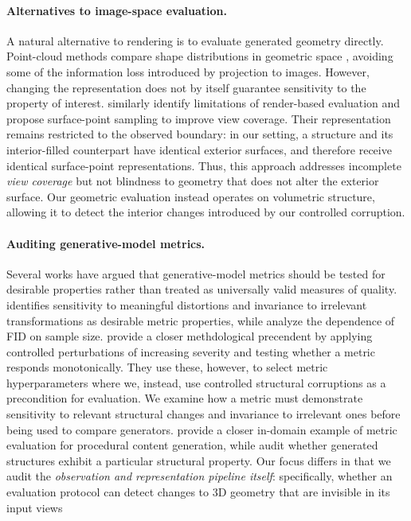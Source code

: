 
\paragraph{Alternatives to image-space evaluation.}
A natural alternative to rendering is to evaluate generated geometry directly. Point-cloud methods compare shape distributions in geometric space \citep{achlioptas2018pointclouds}, avoiding some of the information loss introduced by projection to images. However, changing the representation does not by itself guarantee sensitivity to the property of interest. \citet{luan2026rendermetric} similarly identify limitations of render-based evaluation and propose surface-point sampling to improve view coverage. Their representation remains restricted to the observed boundary: in our setting, a structure and its interior-filled counterpart have identical exterior surfaces, and therefore receive identical surface-point representations. Thus, this approach addresses incomplete \emph{view coverage} but not blindness to geometry that does not alter the exterior surface. Our geometric evaluation instead operates on volumetric structure, allowing it to detect the interior changes introduced by our controlled corruption.

\paragraph{Auditing generative-model metrics.} Several works have argued that generative-model metrics should be tested for desirable properties rather than treated as universally valid measures of quality. \citet{borji2019prosandcons} identifies sensitivity to meaningful distortions and invariance to irrelevant transformations as desirable metric properties, while \citet{chong2020unbiasedfid} analyze the dependence of FID on sample size. 
\citet{obray2022graphmetrics} provide a closer methdological precendent by applying controlled perturbations of increasing severity and testing whether a metric responds monotonically. They use these, however, to select metric hyperparameters where we, instead, use controlled structural corruptions as a precondition for evaluation. We examine how a metric must demonstrate sensitivity to relevant structural changes and invariance to irrelevant ones before being used to compare generators. \citet{herve2021pcgmetrics} provide a closer in-domain example of metric evaluation for procedural content generation, while \citet{caytuiro2025symmetry} audit whether generated structures exhibit a particular structural property. Our focus differs in that we audit the \emph{observation and representation pipeline itself}: specifically, whether an evaluation protocol can detect changes to 3D geometry that are invisible in its input views


